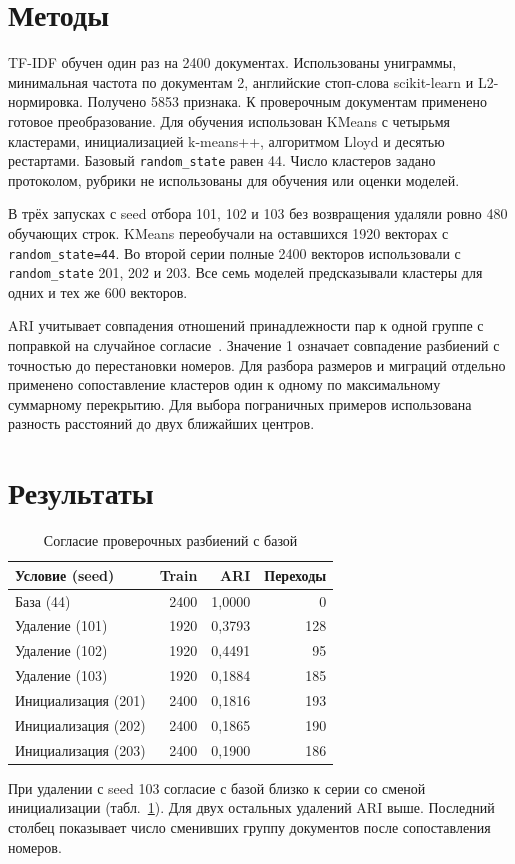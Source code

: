 \documentclass{misisarticle}
\begin{document}
\section{Методы}
TF-IDF обучен один раз на 2400 документах. Использованы униграммы, минимальная частота по документам 2, английские стоп-слова scikit-learn и L2-нормировка. Получено 5853 признака. К проверочным документам применено готовое преобразование. Для обучения использован KMeans с четырьмя кластерами, инициализацией k-means++, алгоритмом Lloyd и десятью рестартами. Базовый \texttt{random\_state} равен 44. Число кластеров задано протоколом, рубрики не использованы для обучения или оценки моделей.

В трёх запусках с seed отбора 101, 102 и 103 без возвращения удаляли ровно 480 обучающих строк. KMeans переобучали на оставшихся 1920 векторах с \texttt{random\_state=44}. Во второй серии полные 2400 векторов использовали с \texttt{random\_state} 201, 202 и 203. Все семь моделей предсказывали кластеры для одних и тех же 600 векторов.

ARI учитывает совпадения отношений принадлежности пар к одной группе с поправкой на случайное согласие~\cite{hubert}. Значение 1 означает совпадение разбиений с точностью до перестановки номеров. Для разбора размеров и миграций отдельно применено сопоставление кластеров один к одному по максимальному суммарному перекрытию. Для выбора пограничных примеров использована разность расстояний до двух ближайших центров.

\section{Результаты}
\begin{table}[htbp]
\caption{Согласие проверочных разбиений с базой}
\label{tab:metrics}
\centering
\begin{tabular}{@{}lrrr@{}}
\toprule
Условие (seed) & Train & ARI & Переходы \\
\midrule
База (44) & 2400 & 1,0000 & 0 \\
Удаление (101) & 1920 & 0,3793 & 128 \\
Удаление (102) & 1920 & 0,4491 & 95 \\
Удаление (103) & 1920 & 0,1884 & 185 \\
Инициализация (201) & 2400 & 0,1816 & 193 \\
Инициализация (202) & 2400 & 0,1865 & 190 \\
Инициализация (203) & 2400 & 0,1900 & 186 \\
\bottomrule
\end{tabular}
\end{table}
При удалении с seed 103 согласие с базой близко к серии со сменой инициализации (табл.~\ref{tab:metrics}). Для двух остальных удалений ARI выше. Последний столбец показывает число сменивших группу документов после сопоставления номеров.
\end{document}
